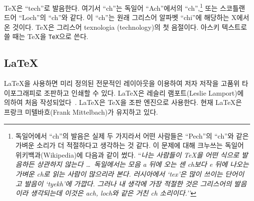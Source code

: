 \TeX 은 ``tech''로 발음한다. 여기서 ``ch''는 독일어 ``Ach''에서의
``ch'',\footnote{독일어에서 ``ch''의 발음은 실제 두 가지라서
어떤 사람들은 ``Pech''의 ``ch''와 같은 가벼운 소리가 더 적절하다고
생각하는 것 같다. 이 문제에 대해 크누쓰는 독일어
위키백과(Wikipedia)에 다음과 같이 썼다. ``\emph{나는 사람들이 \TeX 을
어떤 식으로 발음하든 상관하지 않는다 \ldots\ 독일에서는 모음 a 뒤에
오는 센 ch보다 e 뒤에 나오는 가벼운 ch로 읽는 사람이 많으리라
본다. 러시아에서 `tex'은 많이 쓰이는 단어이고 발음이 `tyekh'에
가깝다. 그러나 내 생각에 가장 적절한 것은 그리스어의 발음이라
생각되는데 이것은 ach, loch와 같은 거친 ch 소리이다.''}}
또는 스코틀랜드어 ``Loch''의 ``ch''와 같다. 이 ``ch''는 원래 그리스어
알파벳 ``chi''에 해당하는 X에서 온 것이다. \TeX 은 그리스어 texnologia
(technology)의 첫 음절이다. 아스키 텍스트로 쓸 때는 \TeX 을
\texttt{TeX}으로 쓴다.

\subsection{\LaTeX}
 
\LaTeX 을 사용하면 미리 정의된 전문적인
레이아웃을 이용하여 저자 저작을 고품위 타이포그래피로 조판하고
인쇄할 수 있다. \LaTeX 은  레슬리
램포트(Leslie Lamport)에 의하여 처음 작성되었다~\cite{manual}. \LaTeX 은 \TeX 을
조판 엔진으로 사용한다. 현재 \LaTeX 은 프랑크 미텔바흐(Frank
Mittelbach)가 유지하고 있다.


